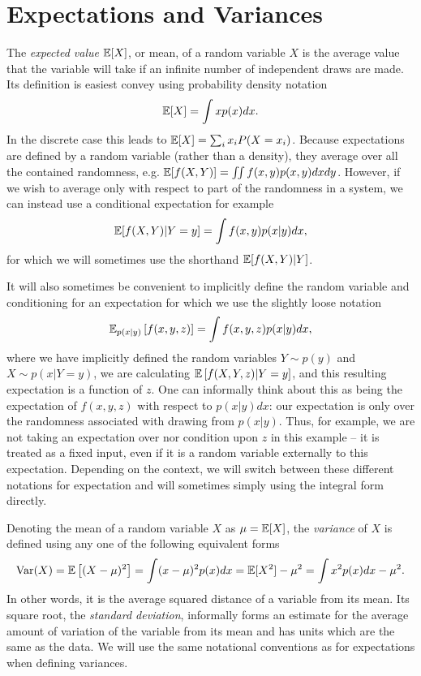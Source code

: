 \section{Expectations and Variances}
\label{sec:prob:expt}

The \emph{expected value} $\mathbb{E} [X]$, or mean, of a random variable $X$ is the average value that the variable
will take if an infinite number of independent draws are made.  Its definition is easiest convey using 
probability density notation
\begin{align}
\label{eq:prob:expt}
\mathbb{E} [X] = \int x p(x)dx.
\end{align}
In the discrete case this leads to $\mathbb{E} [X] = \sum_{i} x_i P(X=x_i)$.  Because expectations are defined by a random
variable (rather than a density), they
average over all the contained randomness, e.g. $\mathbb{E} [f(X,Y)]=\iint f(x,y) p(x,y)dxdy$.  However, if we
wish to average only with respect to part of the randomness in a system, we can instead use a conditional
expectation for example
\begin{align}
\label{eq:prob:cond-expt}
\mathbb{E} [f(X,Y) | Y=y] = \int f(x,y) p(x|y) dx,
\end{align}
for which we will sometimes use the shorthand $\mathbb{E} [f(X,Y) | Y]$.

It will also sometimes be convenient to implicitly define the random variable and conditioning for an 
expectation for which we use the slightly loose notation
\begin{align}
\label{eq:prob:expt-2}
\mathbb{E}_{p(x|y)} \left[f(x,y,z)\right] = \int f(x,y,z) p(x|y) dx,
\end{align}
where we have implicitly defined the random variables $Y \sim p(y)$ and $X \sim p(x | Y=y)$,
we are calculating $\mathbb{E} \left[f(X,Y,z) | Y=y\right]$,
and this resulting expectation is a function of $z$.  One can informally think about this
as being the expectation of $f(x,y,z)$ with respect to $p(x|y)dx$:
our expectation is only over the randomness associated with drawing from $p(x|y)$.  Thus,
for example, we are not taking an expectation over nor condition upon $z$ in this example
-- it is treated as a fixed input, even if it is a random variable externally to this expectation.
Depending on the context, we will switch between these different notations for expectation
and will sometimes simply using the integral form directly.

Denoting the mean of a random variable $X$ as $\mu=\mathbb{E} [X]$, the \emph{variance} of $X$
is defined using any one of the following equivalent forms
\begin{align}
\mathrm{Var} (X) = \mathbb{E} \left[(X-\mu)^2\right] = \int (x-\mu)^2 p(x)dx = \mathbb{E} [X^2] - \mu^2 =
\int x^2 p(x) dx - \mu^2.
\end{align}
In other words, it is the average squared distance of a variable from its mean.
Its square root, the \emph{standard deviation}, informally forms an estimate for the average
amount of variation of the variable from its mean and has units which are the same
as the data.  We will use the same notational conventions as for expectations when defining
variances.

